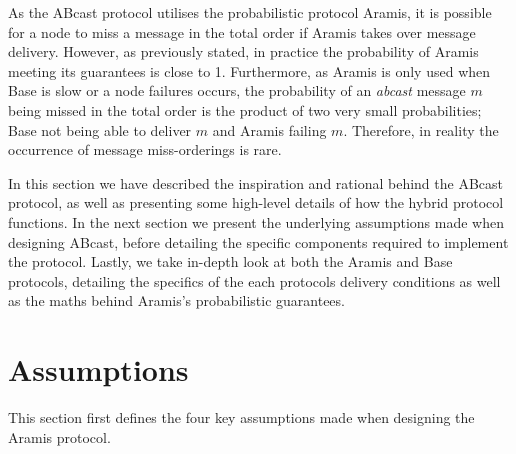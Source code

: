 As the \textsf{ABcast} protocol utilises the probabilistic protocol \textsf{Aramis}, it is possible for a node to miss a message in the total order if \textsf{Aramis} takes over message delivery.  However, as previously stated, in practice the probability of \textsf{Aramis} meeting its guarantees is close to 1.  Furthermore, as \textsf{Aramis} is only used when \textsf{Base} is slow or a node failures occurs, the probability of an \emph{abcast} message $m$ being missed in the total order is the product of two very small probabilities; \textsf{Base} not being able to deliver $m$ and \textsf{Aramis} failing $m$.  Therefore, in reality the occurrence of message miss-orderings is rare.  

In this section we have described the inspiration and rational behind the \textsf{ABcast} protocol, as well as presenting some high-level details of how the hybrid protocol functions.  In the next section we present the underlying assumptions made when designing \textsf{ABcast}, before detailing the specific components required to implement the protocol.  Lastly, we take in-depth look at both the \textsf{Aramis} and \textsf{Base} protocols, detailing the specifics of the each protocols delivery conditions as well as the maths behind \textsf{Aramis}'s probabilistic guarantees.  

\newpage
\section{Assumptions}
    This section first defines the four key assumptions made when designing the \textsf{Aramis} protocol. 

